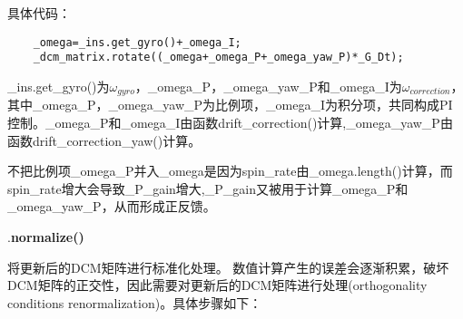 \documentclass[a4paper,10pt]{ctexart} %
\begin{document}
\vspace{8pt}
\noindent 具体代码：
\begin{lstlisting}
    _omega=_ins.get_gyro()+_omega_I;
    _dcm_matrix.rotate((_omega+_omega_P+_omega_yaw_P)*_G_Dt);
\end{lstlisting}
\noindent\_ins.get\_gyro()为$\omega_{gyro}$，\_omega\_P，\_omega\_yaw\_P和\_omega\_I为$\omega_{correction}$，其中\_omega\_P，\_omega\_yaw\_P为比例项，\_omega\_I为积分项，共同构成PI控制。\_omega\_P和\_omega\_I由函数drift\_correction()计算,\_omega\_yaw\_P由函数drift\_correction\_yaw()计算。

不把比例项\_omega\_P并入\_omega是因为spin\_rate由\_omega.length()计算，而spin\_rate增大会导致\_P\_gain增大,\_P\_gain又被用于计算\_omega\_P和\_omega\_yaw\_P，从而形成正反馈。

\vspace{10pt}

.\textbf{normalize()}

将更新后的DCM矩阵进行标准化处理。
数值计算产生的误差会逐渐积累，破坏DCM矩阵的正交性，因此需要对更新后的DCM矩阵进行处理(orthogonality conditions renormalization)。具体步骤如下：
\end{document}
